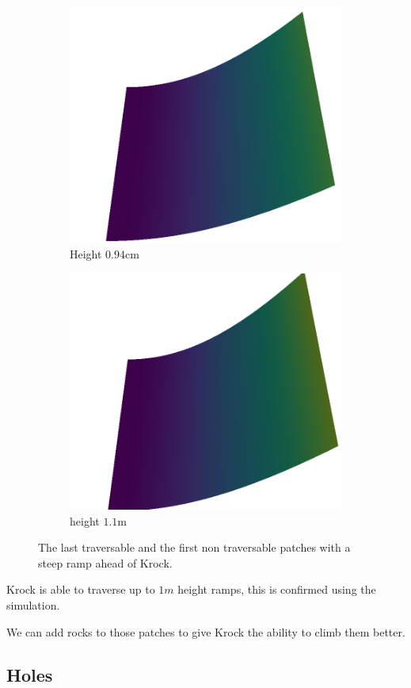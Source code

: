 \documentclass[../document.tex]{subfiles}
\begin{document}
\begin{figure} [htbp]
\begin{subfigure}[b]{0.33\textwidth}
    \end{subfigure}   
    \begin{subfigure}[b]{0.33\textwidth}
        \includegraphics[width=\linewidth]{../img/5/custom_patches/ramp/ramp-6-3d.png}
    \caption{Height $0.94$cm}
    \end{subfigure}   
    \begin{subfigure}[b]{0.33\textwidth}
        \includegraphics[width=\linewidth]{../img/5/custom_patches/ramp/ramp-7-3d}
        \caption{height $1.1$m}
    \end{subfigure}   
\caption{The last traversable and the first non traversable patches with a steep ramp ahead of Krock.}    
\end{figure}
Krock is able to traverse up to $1m$ height ramps, this is confirmed using the simulation.

We can add rocks to those patches to give Krock the ability to climb them better. 

\subsection{Holes}
\end{document}
